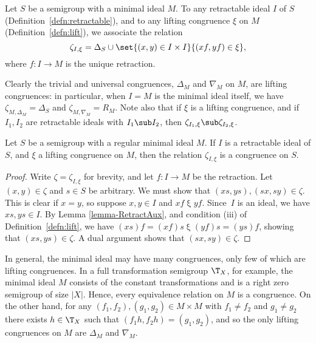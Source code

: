 \begin{definition}\label{defn:lift2}
Let $S$ be a semigroup with a minimal ideal $M$.  To any retractable ideal $I$ of $S$ (Definition~\ref{defn:retractable}), and to any lifting congruence $\xi$ on $M$ (Definition~\ref{defn:lift}), we
associate the relation
\[
  \zeta_{I,\xi}=\Delta_S\cup\set{(x,y)\in I\times I}{(xf,yf) \in \xi},
\]
where $f:I\to M$ is the unique retraction.
\end{definition}

Clearly the trivial and universal congruences, $\Delta_M$ and $\nabla_M$ on $M$, are lifting congruences: in particular, when $I=M$ is the minimal ideal itself, we have $\zeta_{M,\Delta_M} = \Delta_S$ and $\zeta_{M,\nabla_M}=R_M$.  Note also that if $\xi$ is a lifting congruence, and if $I_1,I_2$ are retractable ideals with $I_1\sub I_2$, then $\zeta_{I_1,\xi}\sub\zeta_{I_2,\xi}$.

\begin{proposition}\label{prop:lift}
Let $S$ be a semigroup with a regular minimal ideal $M$.  If $I$ is a retractable ideal of $S$, and $\xi$ a lifting congruence on $M$, then the relation $\zeta_{I,\xi}$ is a congruence on $S$.
\end{proposition}

\begin{proof} Write $\zeta=\zeta_{I,\xi}$ for brevity, and let $f:I\to M$ be the retraction.  Let $(x,y)\in\zeta$ and $s\in S$ be
arbitrary.  We must show that $(xs,ys),(sx,sy)\in\zeta$.  This is clear if
$x=y$, so suppose $x,y\in I$ and $xf\mathrel\xi yf$.  Since~$I$ is an
ideal, we have $xs,ys\in I$.  By Lemma \ref{lemma-RetractAux}, and condition (iii) of Definition~\ref{defn:lift}, we have $(xs)f = (xf)s \mathrel\xi
(yf)s = (ys)f$, showing that $(xs,ys)\in\zeta$.  A dual argument shows that
$(sx,sy)\in\zeta$.
\end{proof}

In general, the minimal ideal may have many congruences, only few of which are lifting congruences.
In a full transformation
semigroup $\T_X$, for example, the minimal ideal $M$ consists of the
constant transformations and is a right zero semigroup of size $|X|$. Hence, every
equivalence relation on $M$ is a congruence. On the other hand, for any $(f_1,
f_2), (g_1,g_2)\in M \times M$ with $f_1\not = f_2$ and $g_1 \not =g_2$
there exists $h\in \T_X$ such that $(f_1h, f_2h) = (g_1,g_2)$, and so
the only lifting congruences on $M$ are $\Delta_M$ and $\nabla_M$. %

